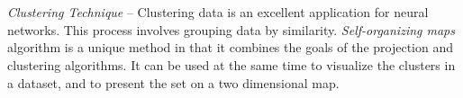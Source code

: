 \documentclass[twocolumn,11pt]{asme2ej}
\begin{document}
%
\\\\
\textit{Clustering Technique} -- Clustering data is an excellent application for neural networks. This process involves grouping data by similarity. \textit{Self-organizing maps} algorithm is a unique method in that it combines the goals of the projection and clustering algorithms. It can be used at the same time to visualize the clusters in a dataset,  and to present the set on a two dimensional map.

%
%
%
\end{document}
